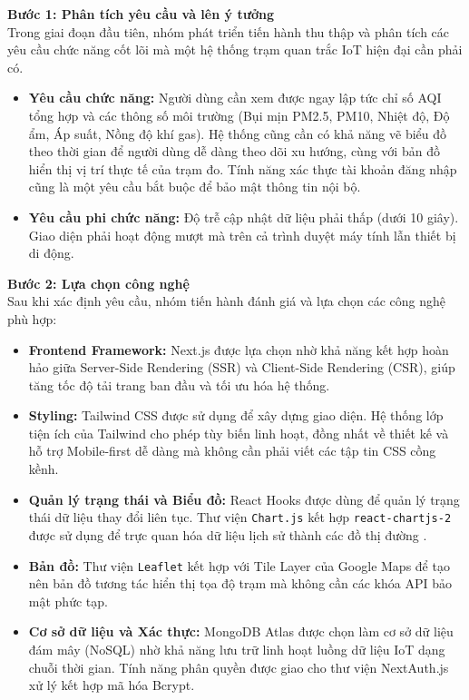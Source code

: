 \documentclass[12pt,a4paper]{article}
\begin{document}
\noindent\textbf{Bước 1: Phân tích yêu cầu và lên ý tưởng}\mbox{}\\
Trong giai đoạn đầu tiên, nhóm phát triển tiến hành thu thập và phân tích các yêu cầu chức năng cốt lõi mà một hệ thống trạm quan trắc IoT hiện đại cần phải có. 
\begin{itemize}
    \item \textbf{Yêu cầu chức năng:} Người dùng cần xem được ngay lập tức chỉ số AQI tổng hợp và các thông số môi trường (Bụi mịn PM2.5, PM10, Nhiệt độ, Độ ẩm, Áp suất, Nồng độ khí gas). Hệ thống cũng cần có khả năng vẽ biểu đồ theo thời gian để người dùng dễ dàng theo dõi xu hướng, cùng với bản đồ hiển thị vị trí thực tế của trạm đo. Tính năng xác thực tài khoản đăng nhập cũng là một yêu cầu bắt buộc để bảo mật thông tin nội bộ.
    \item \textbf{Yêu cầu phi chức năng:} Độ trễ cập nhật dữ liệu phải thấp (dưới 10 giây). Giao diện phải hoạt động mượt mà trên cả trình duyệt máy tính lẫn thiết bị di động.
\end{itemize}

\noindent\textbf{Bước 2: Lựa chọn công nghệ}\mbox{}\\
Sau khi xác định yêu cầu, nhóm tiến hành đánh giá và lựa chọn các công nghệ phù hợp:
\begin{itemize}
    \item \textbf{Frontend Framework:} Next.js được lựa chọn nhờ khả năng kết hợp hoàn hảo giữa Server-Side Rendering (SSR) và Client-Side Rendering (CSR), giúp tăng tốc độ tải trang ban đầu và tối ưu hóa hệ thống.
    \item \textbf{Styling:} Tailwind CSS được sử dụng để xây dựng giao diện. Hệ thống lớp tiện ích của Tailwind cho phép tùy biến linh hoạt, đồng nhất về thiết kế  và hỗ trợ Mobile-first dễ dàng mà không cần phải viết các tập tin CSS cồng kềnh.
    \item \textbf{Quản lý trạng thái và Biểu đồ:} React Hooks được dùng để quản lý trạng thái dữ liệu thay đổi liên tục. Thư viện \texttt{Chart.js} kết hợp \texttt{react-chartjs-2} được sử dụng để trực quan hóa dữ liệu lịch sử thành các đồ thị đường .
    \item \textbf{Bản đồ:} Thư viện \texttt{Leaflet} kết hợp với Tile Layer của Google Maps để tạo nên bản đồ tương tác hiển thị tọa độ trạm mà không cần các khóa API bảo mật phức tạp.
    \item \textbf{Cơ sở dữ liệu và Xác thực:} MongoDB Atlas được chọn làm cơ sở dữ liệu đám mây (NoSQL) nhờ khả năng lưu trữ linh hoạt luồng dữ liệu IoT dạng chuỗi thời gian. Tính năng phân quyền được giao cho thư viện NextAuth.js xử lý kết hợp mã hóa Bcrypt.
\end{itemize}
\end{document}
